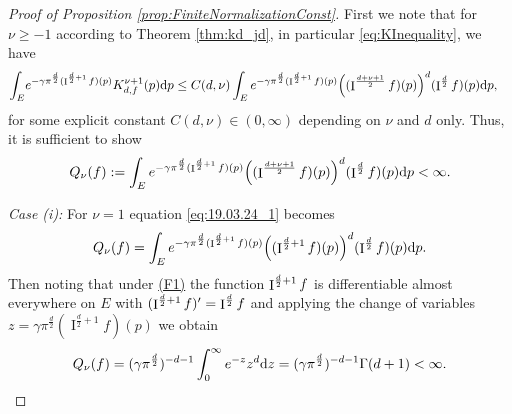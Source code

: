 \documentclass[11pt,a4paper]{article}
\theoremstyle{plain}
\theoremstyle{definition}
\theoremstyle{remark}
\newcommand{\dd}{{\rm d}}
\newcommand{\frI}{\mathop{\mathrm{I}}\nolimits}
\begin{document}
\begin{proof}[Proof of Proposition \ref{prop:FiniteNormalizationConst}]
    First we note that for $\nu\ge-1$ according to Theorem \ref{thm:kd_jd}, in particular \eqref{eq:KInequality}, we have
    \begin{align*}
     \int_{E}&e^{-\gamma\pi^{\frac{d}{2}}(\frI^{\frac{d}{2}+1}f)(p)} K^{\nu+1}_{d,f}(p) \dd p\leq C(d,\nu)\int_{E}e^{-\gamma\pi^{\frac{d}{2}}(\frI^{\frac{d}{2}+1}f)(p)} \Big((\frI^{{d+\nu+1\over 2}}f)(p)\Big)^d(\frI^{{d\over 2}}f)(p) \dd p,
    \end{align*}
    for some explicit constant $C(d,\nu)\in(0,\infty)$ depending on $\nu$ and $d$ only. Thus, it is sufficient to show
    \begin{equation}\label{eq:19.03.24_1}
        Q_{\nu}(f):=\int_{E}e^{-\gamma\pi^{\frac{d}{2}}(\frI^{\frac{d}{2}+1}f)(p)} \Big((\frI^{{d+\nu+1\over 2}}f)(p)\Big)^d(\frI^{{d\over 2}}f)(p) \dd p<\infty.
    \end{equation}

    \textit{Case (i):} For $\nu=1$ equation \eqref{eq:19.03.24_1} becomes 
    \begin{align*}
        Q_{\nu}(f)= \int_{E}e^{-\gamma\pi^{\frac{d}{2}}(\frI^{\frac{d}{2}+1}f)(p)} \Big((\frI^{{d\over 2}+1}f)(p)\Big)^d(\frI^{{d\over 2}}f)(p) \dd p.
    \end{align*}
    Then noting that under \hyperref[item:F1]{(F1)} the function $\frI^{{d\over 2}+1}f$ is differentiable almost everywhere on $E$ with $(\frI^{{d\over 2}+1}f)'=\frI^{{d\over 2}}f$ and applying the change of variables $z=\gamma\pi^{\frac{d}{2}}(\frI^{\frac{d}{2}+1}f)(p)$ we obtain
    \begin{align*}
        Q_{\nu}(f)=(\gamma\pi^{d\over 2})^{-d-1}\int_{0}^\infty e^{-z}z^d \dd z = (\gamma\pi^{d\over 2})^{-d-1}\Gamma(d+1) < \infty.
    \end{align*}


\end{proof}
\end{document}
